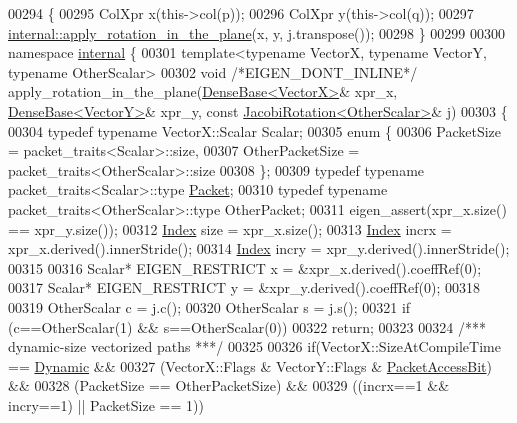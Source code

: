 \begin{DoxyCode}
00294 \{
00295   ColXpr x(this->col(p));
00296   ColXpr y(this->col(q));
00297   \hyperlink{namespace_eigen_1_1internal_a5f7738a5c56c9b9decf94d9728ba7906}{internal::apply\_rotation\_in\_the\_plane}(x, y, j.transpose());
00298 \}
00299 
00300 \textcolor{keyword}{namespace }\hyperlink{namespaceinternal}{internal} \{
00301 \textcolor{keyword}{template}<\textcolor{keyword}{typename} VectorX, \textcolor{keyword}{typename} VectorY, \textcolor{keyword}{typename} OtherScalar>
00302 \textcolor{keywordtype}{void} \textcolor{comment}{/*EIGEN\_DONT\_INLINE*/} apply\_rotation\_in\_the\_plane(\hyperlink{group___core___module_class_eigen_1_1_dense_base}{DenseBase<VectorX>}& xpr\_x, 
      \hyperlink{group___core___module_class_eigen_1_1_dense_base}{DenseBase<VectorY>}& xpr\_y, \textcolor{keyword}{const} \hyperlink{group___jacobi___module_class_eigen_1_1_jacobi_rotation}{JacobiRotation<OtherScalar>}& 
      j)
00303 \{
00304   \textcolor{keyword}{typedef} \textcolor{keyword}{typename} VectorX::Scalar Scalar;
00305   \textcolor{keyword}{enum} \{
00306     PacketSize = packet\_traits<Scalar>::size,
00307     OtherPacketSize = packet\_traits<OtherScalar>::size
00308   \};
00309   \textcolor{keyword}{typedef} \textcolor{keyword}{typename} packet\_traits<Scalar>::type \hyperlink{group___sparse_core___module}{Packet};
00310   \textcolor{keyword}{typedef} \textcolor{keyword}{typename} packet\_traits<OtherScalar>::type OtherPacket;
00311   eigen\_assert(xpr\_x.size() == xpr\_y.size());
00312   \hyperlink{namespace_eigen_a62e77e0933482dafde8fe197d9a2cfde}{Index} size = xpr\_x.size();
00313   \hyperlink{namespace_eigen_a62e77e0933482dafde8fe197d9a2cfde}{Index} incrx = xpr\_x.derived().innerStride();
00314   \hyperlink{namespace_eigen_a62e77e0933482dafde8fe197d9a2cfde}{Index} incry = xpr\_y.derived().innerStride();
00315 
00316   Scalar* EIGEN\_RESTRICT x = &xpr\_x.derived().coeffRef(0);
00317   Scalar* EIGEN\_RESTRICT y = &xpr\_y.derived().coeffRef(0);
00318   
00319   OtherScalar c = j.c();
00320   OtherScalar s = j.s();
00321   \textcolor{keywordflow}{if} (c==OtherScalar(1) && s==OtherScalar(0))
00322     \textcolor{keywordflow}{return};
00323 
00324   \textcolor{comment}{/*** dynamic-size vectorized paths ***/}
00325 
00326   \textcolor{keywordflow}{if}(VectorX::SizeAtCompileTime == \hyperlink{namespace_eigen_ad81fa7195215a0ce30017dfac309f0b2}{Dynamic} &&
00327     (VectorX::Flags & VectorY::Flags & \hyperlink{group__flags_ga1a306a438e1ab074e8be59512e887b9f}{PacketAccessBit}) &&
00328     (PacketSize == OtherPacketSize) &&
00329     ((incrx==1 && incry==1) || PacketSize == 1))

\end{DoxyCode}
